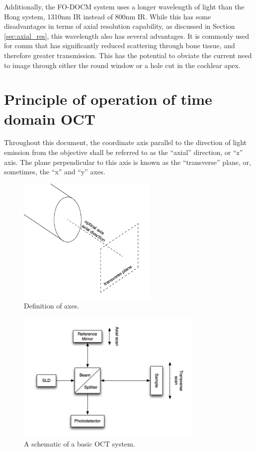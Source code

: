 Additionally, the FO-DOCM system uses a longer wavelength of light than the Hong system, 1310nm IR instead of 800nm IR. While this has some disadvantages in terms of axial resolution capability, as discussed in Section \ref{sec:axial_res}, this wavelength also has several advantages. It is commonly used for comm that has significantly reduced scattering through bone tissue, and therefore greater transmission. This has the potential to obviate the current need to image through either the round window or a hole cut in the cochlear apex. \cite{needcitation}

\section{Principle of operation of time domain OCT}
\label{sec:principles_oct}

Throughout this document, the coordinate axis parallel to the direction of light emission from the objective shall be referred to as the ``axial'' direction, or ``z'' axis. The plane perpendicular to this axis is known as the ``transverse'' plane, or, sometimes, the ``x'' and ``y'' axes.

\begin{figure}[h!]
\centering
\includegraphics[width=0.6\textwidth]{Images/Background/axes.png}
\caption{Definition of axes.}
\end{figure}

\begin{figure}[h!]
  \centering
    \includegraphics[width=0.8\textwidth]{Images/Background/basic_oct.png}
      \caption{A schematic of a basic OCT system.}
\end{figure}


